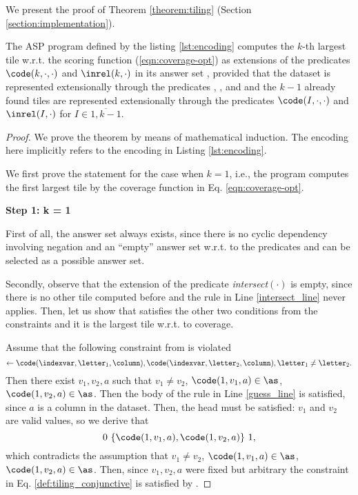 We present the proof of Theorem \ref{theorem:tiling} (Section \ref{section:implementation}).
\begin{theorem-non}
The ASP program \pprog defined by the listing \ref{lst:encoding} computes the $k$-th largest tile w.r.t. the scoring function \maxcover (\ref{eqn:coverage-opt}) as extensions of the predicates $\code(k,\cdot,\cdot)$ and $\inrel(k,\cdot)$ in its answer set \as, provided that 
the dataset is represented extensionally through the predicates \db, \valid, and \col 
and the $k-1$ already found tiles are represented extensionally through the predicates $\code(I,\cdot,\cdot)$ and $\inrel(I,\cdot)$ for $I \in \overline{1,k-1}$.
\end{theorem-non}

\begin{proof}
  We prove the theorem by means of mathematical induction. The encoding here implicitly refers to the encoding in  Listing \ref{lst:encoding}.

  We first prove the statement for the case when $k=1$, i.e., the program \pprog computes the first largest tile by the coverage function in Eq. \ref{eqn:coverage-opt}.

  \textbf{Step 1: k = 1}

  First of all, the answer set \as always exists, since there is no cyclic dependency involving negation and an ``empty'' answer set w.r.t. to the predicates \code and \inrel can be selected as a possible answer set.

  Secondly, observe that the extension of the predicate \textit{intersect$(\cdot)$} is empty, since there is no other tile computed before and the rule in Line \ref{intersect_line} never applies. Then, let us show that \as satisfies the other two conditions from the constraints \constr and it is the largest tile w.r.t. to coverage.

  Assume that the following constraint from \constr is violated
\begin{equation*}
\leftarrow \code(\indexvar,\letter_1, \column), \code(\indexvar,\letter_2, \column), \letter_1 \neq \letter_2.
\end{equation*}
Then there exist $v_1, v_2, a$ such that $v_1 \neq v_2$, $\code(1, v_1, a) \in \as$, $\code(1, v_2, a) \in \as$. Then the body of the rule in Line \ref{guess_line} is satisfied, since $a$ is a column in the dataset. Then, the head must be satisfied: $v_1$ and $v_2$ are valid values, so we derive that
\begin{equation*}
  0~\{ \code(1,v_1,a), \code(1,v_2,a) \}~1,
\end{equation*}
which contradicts the assumption that $v_1 \neq v_2$, $\code(1, v_1, a) \in \as$, $\code(1, v_2, a) \in \as$. Then, since $v_1,v_2, a$ were fixed but arbitrary the constraint in Eq. \ref{def:tiling_conjunctive} is satisfied by \as.


\end{proof}
